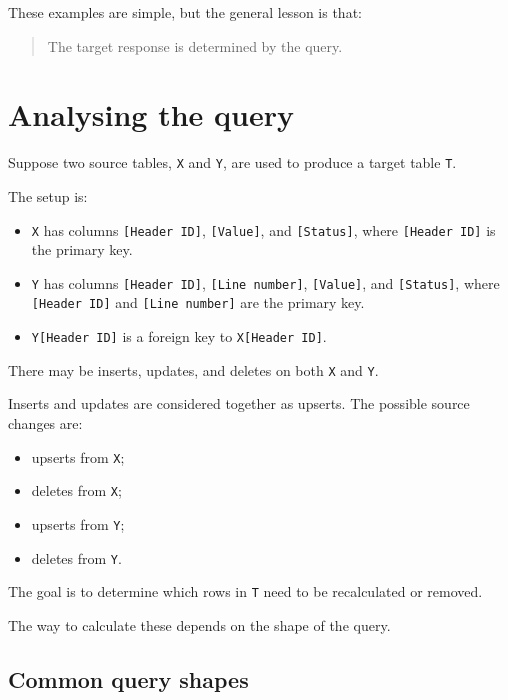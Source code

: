 \documentclass[10pt,openany,10pt]{book}
\providecommand{\tightlist}{%
  \setlength{\itemsep}{0pt}\setlength{\parskip}{0pt}}
\begin{document}
These examples are simple, but the general lesson is that:

\begin{quote}
The target response is determined by the query.
\end{quote}

\section{Analysing the query}\label{analysing-the-query}

Suppose two source tables, \texttt{X} and \texttt{Y}, are used to
produce a target table \texttt{T}.

The setup is:

\begin{itemize}
\tightlist
\item
  \texttt{X} has columns \texttt{{[}Header\ ID{]}},
  \texttt{{[}Value{]}}, and \texttt{{[}Status{]}}, where
  \texttt{{[}Header\ ID{]}} is the primary key.
\item
  \texttt{Y} has columns \texttt{{[}Header\ ID{]}},
  \texttt{{[}Line\ number{]}}, \texttt{{[}Value{]}}, and
  \texttt{{[}Status{]}}, where \texttt{{[}Header\ ID{]}} and
  \texttt{{[}Line\ number{]}} are the primary key.
\item
  \texttt{Y{[}Header\ ID{]}} is a foreign key to
  \texttt{X{[}Header\ ID{]}}.
\end{itemize}

There may be inserts, updates, and deletes on both \texttt{X} and
\texttt{Y}.

Inserts and updates are considered together as upserts. The possible
source changes are:

\begin{itemize}
\tightlist
\item
  upserts from \texttt{X};
\item
  deletes from \texttt{X};
\item
  upserts from \texttt{Y};
\item
  deletes from \texttt{Y}.
\end{itemize}

The goal is to determine which rows in \texttt{T} need to be
recalculated or removed.

The way to calculate these depends on the shape of the query.

\subsection{Common query shapes}\label{common-query-shapes}
\end{document}

